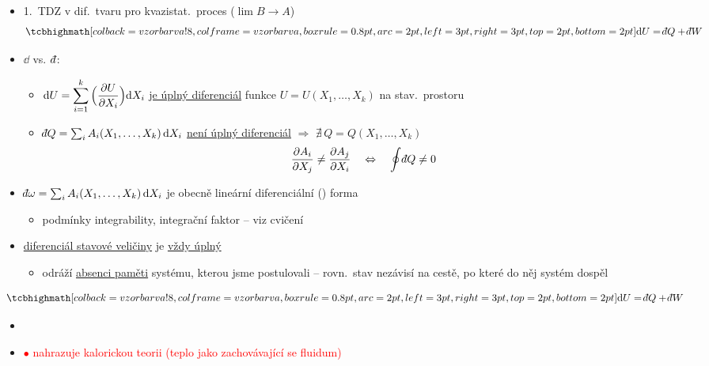 \begin{itemize}
  \item 1.\ TDZ v dif.\ tvaru pro kvazistat.\ proces ($\lim B\to A$)
  \[ \vzorec{\dd U = \dbar Q + \dbar W} \]
  \item $\dd$ vs.\ $\dbar$:
  \begin{itemize}
    \item $\dd U = \displaystyle\sum_{i=1}^{k}\Big(\pdv{U}{X_i}\Big)\dd X_i$ \quad \underline{je úplný diferenciál} funkce $U = U(X_1,\dots,X_k)$ na stav.\ prostoru
    \item $\dbar Q = \sum_i A_i(X_1,\dots,X_k)\,\dd X_i$ \quad \underline{není úplný diferenciál} $\Rightarrow$ $\nexists\, Q = Q(X_1,\dots,X_k)$
    \[
      \pdv{A_i}{X_j} \neq \pdv{A_j}{X_i} \quad\Leftrightarrow\quad \oint\dbar Q \neq 0
    \]
  \end{itemize}
  \item $\dbar\omega = \sum_i A_i(X_1,\dots,X_k)\,\dd X_i$ je obecně lineární diferenciální () forma
  \begin{itemize}
    \item podmínky integrability, integrační faktor -- viz cvičení
          \hfill {}
  \end{itemize}
  \item \underline{diferenciál stavové veličiny} je \underline{vždy úplný}
  \begin{itemize}
    \item[--] odráží \underline{absenci paměti} systému, kterou jsme postulovali -- rovn.\ stav nezávisí na cestě, po které do něj systém dospěl
  \end{itemize}
\end{itemize}

\begin{veta}
\[ \vzorec{\dd U = \dbar Q + \dbar W} \]
\begin{itemize}[nosep]
  \item {}
  \item {}
        \quad \textcolor{Red}{$\bullet$ nahrazuje kalorickou teorii (teplo jako zachovávající se fluidum)}
\end{itemize}
\end{veta}

